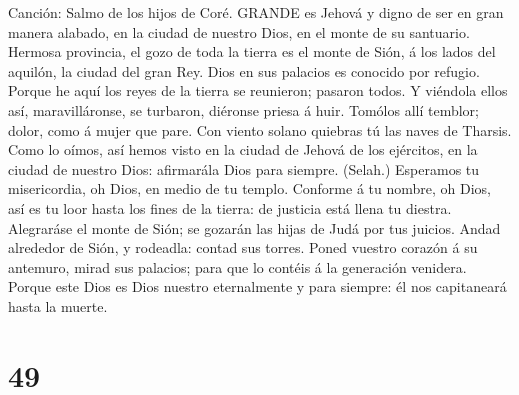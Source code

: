  Canción: Salmo de los hijos de Coré. GRANDE es Jehová y
digno de ser en gran manera alabado, en la ciudad de nuestro Dios, en el
monte de su santuario.  Hermosa provincia, el gozo de toda
la tierra es el monte de Sión, á los lados del aquilón, la ciudad del
gran Rey.  Dios en sus palacios es conocido por refugio.
 Porque he aquí los reyes de la tierra se reunieron; pasaron
todos.  Y viéndola ellos así, maravilláronse, se turbaron,
diéronse priesa á huir.  Tomólos allí temblor; dolor, como á
mujer que pare.  Con viento solano quiebras tú las naves de
Tharsis.  Como lo oímos, así hemos visto en la ciudad de
Jehová de los ejércitos, en la ciudad de nuestro Dios: afirmarála Dios
para siempre. (Selah.)  Esperamos tu misericordia, oh Dios,
en medio de tu templo.  Conforme á tu nombre, oh Dios, así
es tu loor hasta los fines de la tierra: de justicia está llena tu
diestra.  Alegraráse el monte de Sión; se gozarán las hijas
de Judá por tus juicios.  Andad alrededor de Sión, y
rodeadla: contad sus torres.  Poned vuestro corazón á su
antemuro, mirad sus palacios; para que lo contéis á la generación
venidera.  Porque este Dios es Dios nuestro eternalmente y
para siempre: él nos capitaneará hasta la muerte.

\hypertarget{section-48}{%
\section{49}\label{section-48}}

